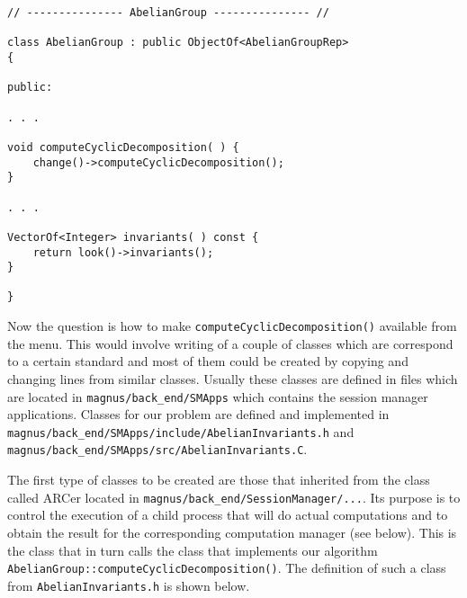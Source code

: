 \documentclass[12pt]{article}
\begin{document}
\footnotesize
\begin{verbatim}
// --------------- AbelianGroup --------------- //

class AbelianGroup : public ObjectOf<AbelianGroupRep>
{

public:

. . .

void computeCyclicDecomposition( ) {
    change()->computeCyclicDecomposition();
}

. . .

VectorOf<Integer> invariants( ) const {
    return look()->invariants();
}

}
\end{verbatim}
\normalsize


Now the question is how to make  {\tt computeCyclicDecomposition()}
available from
the menu. This would involve writing of a couple of classes which are
correspond to a
certain standard and most of them could be created by copying and changing
lines from similar classes.
Usually these classes are  defined in files which are located in
{\tt magnus/back\_end/SMApps} which contains the
session manager applications. Classes for our problem are defined and implemented
in
{\tt magnus/back\_end/SMApps/include/AbelianInvariants.h} and
{\tt magnus/back\_end/SMApps/src/AbelianInvariants.C}.

The first type of classes to be created are those that inherited from
the class called ARCer
located in {\tt magnus/back\_end/SessionManager/...}. Its purpose is
to control
the execution of a child process that will do actual computations and to obtain
the
result for the corresponding computation manager (see below).
This is the class that in turn calls the class that implements our algorithm
{\tt AbelianGroup::computeCyclicDecomposition()}.  The definition of 
such a class
from {\tt AbelianInvariants.h} is shown below.
\end{document}
